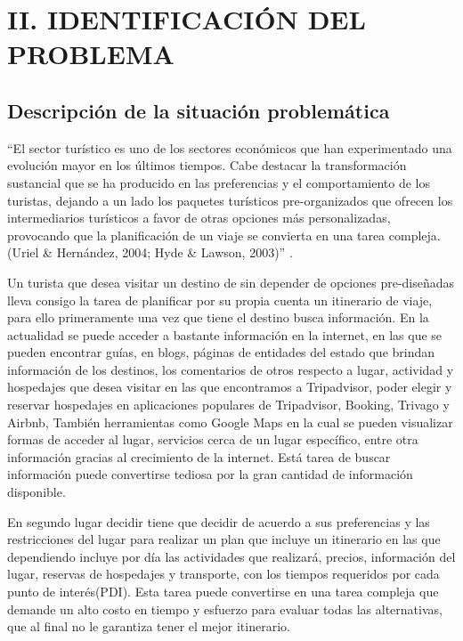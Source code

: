 \chapter{II. IDENTIFICACIÓN DEL PROBLEMA }
\section{Descripción de la situación problemática}
“El sector turístico es uno de los sectores económicos que han experimentado una evolución mayor en los últimos tiempos. Cabe destacar la transformación sustancial que se ha producido en las preferencias y el comportamiento de los turistas, dejando a un lado los paquetes turísticos pre-organizados que ofrecen los intermediarios turísticos a favor de otras opciones más personalizadas, provocando que la planificación de un viaje se convierta en una tarea compleja.(Uriel \& Hernández, 2004; Hyde \& Lawson, 2003)” \cite{RodriguezDiaz2012SistemaPersonalizado}. 

Un turista que desea visitar un destino de sin depender de opciones pre-diseñadas lleva consigo la tarea de planificar por su propia cuenta un itinerario de viaje, para ello primeramente una vez que tiene el destino busca información. En la actualidad se puede acceder a bastante información en la internet, en las que se pueden encontrar guías, en blogs, páginas de entidades del estado que brindan información de los destinos, los comentarios de otros respecto a lugar, actividad y hospedajes que desea visitar en las que encontramos a Tripadvisor, poder elegir y reservar hospedajes en aplicaciones populares de Tripadvisor, Booking, Trivago y Airbnb, También herramientas como Google Maps en la cual se pueden visualizar formas de acceder al lugar, servicios cerca de un lugar específico, entre otra información gracias al crecimiento de la internet. Está tarea de buscar información puede convertirse tediosa por la gran cantidad de información disponible.

En segundo lugar decidir tiene que decidir de acuerdo a sus preferencias y las restricciones del lugar para realizar un plan que incluye un itinerario en las que dependiendo incluye por día las actividades que realizará, precios, información del lugar, reservas de hospedajes y transporte, con los tiempos requeridos por cada punto de interés(PDI). Esta tarea puede convertirse en una tarea compleja que demande un alto costo en tiempo y esfuerzo para evaluar todas las alternativas, que al final no le garantiza tener el mejor itinerario.

